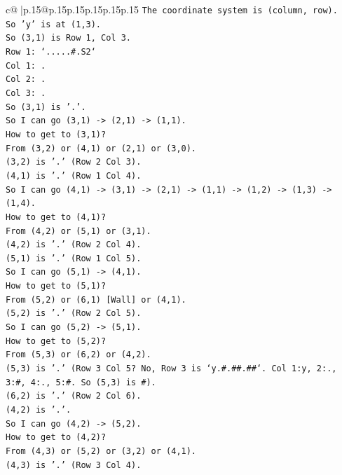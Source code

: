 \documentclass{article}
\begin{document}
{\begin{supertabular}{c@{$\;$}|p{.15\linewidth}@{}p{.15\linewidth}p{.15\linewidth}p{.15\linewidth}p{.15\linewidth}p{.15\linewidth}}
{{{\texttt{The coordinate system is (column, row).} \\
\texttt{So 'y' is at (1,3).} \\
\texttt{So (3,1) is Row 1, Col 3.} \\
\texttt{Row 1: `.....\#.S2`} \\
\texttt{Col 1: .} \\
\texttt{Col 2: .} \\
\texttt{Col 3: .} \\
\texttt{So (3,1) is '.'.} \\
\texttt{So I can go (3,1) {-}> (2,1) {-}> (1,1).} \\
\texttt{How to get to (3,1)?} \\
\texttt{From (3,2) or (4,1) or (2,1) or (3,0).} \\
\texttt{(3,2) is '.' (Row 2 Col 3).} \\
\texttt{(4,1) is '.' (Row 1 Col 4).} \\
\texttt{So I can go (4,1) {-}> (3,1) {-}> (2,1) {-}> (1,1) {-}> (1,2) {-}> (1,3) {-}> (1,4).} \\
\texttt{How to get to (4,1)?} \\
\texttt{From (4,2) or (5,1) or (3,1).} \\
\texttt{(4,2) is '.' (Row 2 Col 4).} \\
\texttt{(5,1) is '.' (Row 1 Col 5).} \\
\texttt{So I can go (5,1) {-}> (4,1).} \\
\texttt{How to get to (5,1)?} \\
\texttt{From (5,2) or (6,1) {[}Wall{]} or (4,1).} \\
\texttt{(5,2) is '.' (Row 2 Col 5).} \\
\texttt{So I can go (5,2) {-}> (5,1).} \\
\texttt{How to get to (5,2)?} \\
\texttt{From (5,3) or (6,2) or (4,2).} \\
\texttt{(5,3) is '.' (Row 3 Col 5? No, Row 3 is `y.\#.\#\#.\#\#`. Col 1:y, 2:., 3:\#, 4:., 5:\#. So (5,3) is \#).} \\
\texttt{(6,2) is '.' (Row 2 Col 6).} \\
\texttt{(4,2) is '.'.} \\
\texttt{So I can go (4,2) {-}> (5,2).} \\
\texttt{How to get to (4,2)?} \\
\texttt{From (4,3) or (5,2) or (3,2) or (4,1).} \\
\texttt{(4,3) is '.' (Row 3 Col 4).} \\
}}}
\end{supertabular}}
\end{document}
